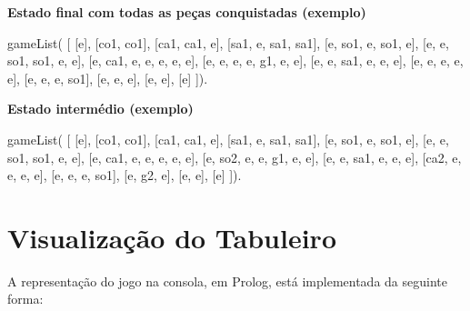 \vspace{1cm}

\textbf{Estado final com todas as peças conquistadas (exemplo)}

gameList( [ [e],
		[co1, co1],
		[ca1, ca1, e],
		[sa1, e, sa1, sa1],
    [e, so1, e, so1, e],
		[e, e, so1, so1, e, e],
		[e, ca1, e, e, e, e, e],
    [e, e, e, e, g1, e, e],
		[e, e, sa1, e, e, e],
		[e, e, e, e, e],
		[e, e, e, so1],
    [e, e, e],
		[e, e],
 		[e]  ]).

\vspace{1cm}

\textbf{Estado intermédio (exemplo)}

gameList( [ [e],
		[co1, co1],
		[ca1, ca1, e],
		[sa1, e, sa1, sa1],
    [e, so1, e, so1, e],
		[e, e, so1, so1, e, e],
		[e, ca1, e, e, e, e, e],
    [e, so2, e, e, g1, e, e],
		[e, e, sa1, e, e, e],
		[ca2, e, e, e, e],
		[e, e, e, so1],
    [e, g2, e],
		[e, e],
 		[e]  ]).


\newpage


\section{Visualização do Tabuleiro}

A representação do jogo na consola, em Prolog, está implementada da seguinte forma:

